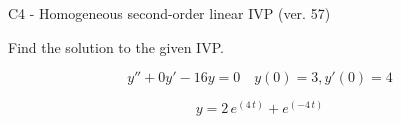\begin{exercise}
  \begin{exerciseTitle}C4 - Homogeneous second-order linear IVP (ver. 57)\end{exerciseTitle}
  \begin{exerciseStatement}
    
Find the solution to the given IVP.

    
\[y''+0y'-16y = 0 \hspace{1em} y(0) = 3 , y'(0) = 4\]

  \end{exerciseStatement}
  \begin{exerciseAnswer}
    
\[y= 2 \, e^{\left(4 \, t\right)} + e^{\left(-4 \, t\right)}\]

  \end{exerciseAnswer}
\end{exercise}